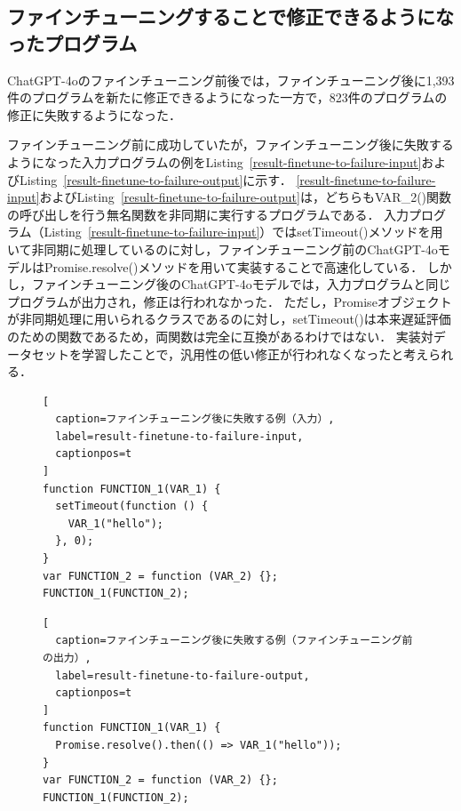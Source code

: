 \documentclass[11pt]{jreport}
\begin{document}


\subsection{ファインチューニングすることで修正できるようになったプログラム}


ChatGPT-4oのファインチューニング前後では，ファインチューニング後に1,393件のプログラムを新たに修正できるようになった一方で，823件のプログラムの修正に失敗するようになった．

ファインチューニング前に成功していたが，ファインチューニング後に失敗するようになった入力プログラムの例をListing~\ref{result-finetune-to-failure-input}およびListing~\ref{result-finetune-to-failure-output}に示す．
\ref{result-finetune-to-failure-input}およびListing~\ref{result-finetune-to-failure-output}は，どちらもVAR\_2()関数の呼び出しを行う無名関数を非同期に実行するプログラムである．
入力プログラム（Listing~\ref{result-finetune-to-failure-input}）ではsetTimeout()メソッドを用いて非同期に処理しているのに対し，ファインチューニング前のChatGPT-4oモデルはPromise.resolve()メソッドを用いて実装することで高速化している．
しかし，ファインチューニング後のChatGPT-4oモデルでは，入力プログラムと同じプログラムが出力され，修正は行われなかった．
ただし，Promiseオブジェクトが非同期処理に用いられるクラスであるのに対し，setTimeout()は本来遅延評価のための関数であるため，両関数は完全に互換があるわけではない．
実装対データセットを学習したことで，汎用性の低い修正が行われなくなったと考えられる．


\begin{figure}[t]
\captionsetup{name=Listing}
\hspace{0.04\columnwidth}
\begin{minipage}[b]{0.96\linewidth}
\begin{lstlisting}[
  caption=ファインチューニング後に失敗する例（入力）,
  label=result-finetune-to-failure-input,
  captionpos=t
]
function FUNCTION_1(VAR_1) {
  setTimeout(function () {
    VAR_1("hello");
  }, 0);
}
var FUNCTION_2 = function (VAR_2) {};
FUNCTION_1(FUNCTION_2);
\end{lstlisting}
\end{minipage}

\hspace{0.04\columnwidth}
\begin{minipage}[b]{0.96\linewidth}
\begin{lstlisting}[
  caption=ファインチューニング後に失敗する例（ファインチューニング前の出力）,
  label=result-finetune-to-failure-output,
  captionpos=t
]
function FUNCTION_1(VAR_1) {
  Promise.resolve().then(() => VAR_1("hello"));
}
var FUNCTION_2 = function (VAR_2) {};
FUNCTION_1(FUNCTION_2);
\end{lstlisting}
\end{minipage}
\end{figure}
\end{document}
